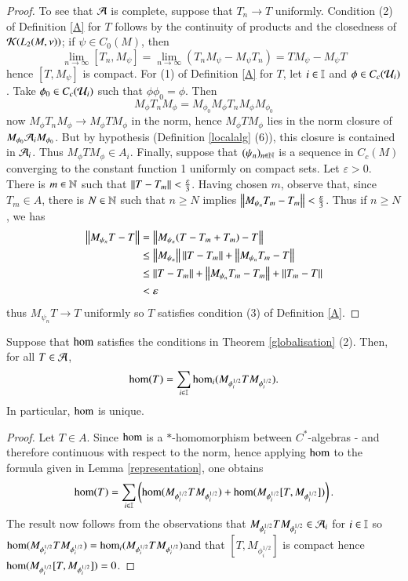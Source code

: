 \documentclass[leqno]{amsart}
\begin{document}
\begin{proof}
		To see that ${\mathcal A}$ is complete, suppose that $T_n\to T$ uniformly. Condition (2) of Definition \ref{A} for $T$ follows by the continuity of products and the closedness of ${\mathcal K}(L_2(M,\nu))$; if $\psi\in C_0(M)$, then
		$$\lim_{n\to\infty}[T_n, M_\psi]=\lim_{n\to\infty}(T_nM_\psi-M_\psi T_n)=TM_\psi-M_\psi T$$
		hence $[T, M_\psi]$ is compact. For (1) of Definition \ref{A} for $T$, let $i\in\mathbb I$ and $\phi\in C_c({\mathcal U}_i)$. Take $\phi_0\in C_c({\mathcal U}_i)$ such that $\phi\phi_0=\phi$. Then
		$$M_\phi T_n M_\phi=M_{\phi_0}M_\phi T_n M_\phi M_{\phi_0}$$
		now $M_\phi T_n M_\phi\to M_\phi TM_\phi$ in the norm, hence $M_\phi TM_\phi$ lies in the norm closure of $M_{\phi_0} {\mathcal A}_iM_{\phi_0}$. But by hypothesis (Definition \ref{localalg} (6)), this closure is contained in ${\mathcal A}_i$. Thus $M_\phi TM_\phi\in A_i$. Finally, suppose that $(\psi_n)_{n\in\mathbb{N}}$ is a sequence in $C_{c}(M)$ converging to the constant function 1 uniformly on compact sets. Let $\varepsilon>0$. There is $m\in\mathbb{N}$ such that $\left\lVert T-T_m\right\rVert<\frac{\varepsilon}{3}$. Having chosen $m$, observe that, since $T_m\in A$, there is $N\in\mathbb{N}$ such that $n\geq N$ implies $\left\lVert M_{\psi_n}T_m-T_m\right\rVert<\frac{\varepsilon}{3}$. Thus if $n\geq N$, we has
		\begin{align*}
			\left\lVert M_{\psi_n} T-T\right\rVert&=\left\lVert M_{\psi_n} (T-T_m+T_m)-T\right\rVert\\
			&\leq \left\lVert M_{\psi_n}\right\rVert\left\lVert T-T_m\right\rVert+\left\lVert M_{\psi_n}T_m-T\right\rVert\\
			&\leq \left\lVert T-T_m\right\rVert+\left\lVert M_{\psi_n}T_m-T_m\right\rVert+\left\lVert T_m-T\right\rVert\\
			&<\varepsilon
		\end{align*}
		thus $M_{\psi_n}T\to T$ uniformly so $T$ satisfies condition (3) of Definition \ref{A}.
	\end{proof}
	
	\begin{proposition}\label{homconst}
		Suppose that ${\rm hom}$ satisfies the conditions in Theorem \ref{globalisation} (2). Then, for all $T\in{\mathcal A}$,
		$${\rm hom}(T)=\sum_{i\in\mathbb I} {\rm hom}_i(M_{\phi_i^{1/2}}TM_{\phi_i^{1/2}}).$$
		In particular, ${\rm hom}$ is unique.
	\end{proposition}
	\begin{proof}
		Let $T\in A$. Since ${\rm hom}$ is a $*$-homomorphism between $C^*$-algebras - and therefore continuous with respect to the norm, hence applying ${\rm hom}$ to the formula given in Lemma \ref{representation}, one obtains
		\begin{align*}
			{\rm hom}(T)=\sum_{i\in\mathbb I}\left({\rm hom}(M_{\phi_i^{1/2}} TM_{\phi_i^{1/2}})+{\rm hom}(M_{\phi_i^{1/2}}[T, M_{\phi_i^{1/2}}])\right).
		\end{align*}
		The result now follows from the observations that $M_{\phi_i^{1/2}} TM_{\phi_i^{1/2}}\in{\mathcal A}_i$ for $i\in\mathbb I$ so ${\rm hom}(M_{\phi_i^{1/2}} TM_{\phi_i^{1/2}})={\rm hom}_i(M_{\phi_i^{1/2}} TM_{\phi_i^{1/2}})$and that $[T, M_{\phi_i^{1/2}}]$ is compact hence ${\rm hom}(M_{\phi_i^{1/2}}[T, M_{\phi_i^{1/2}}])=0$.
	\end{proof}
	
\end{document}
